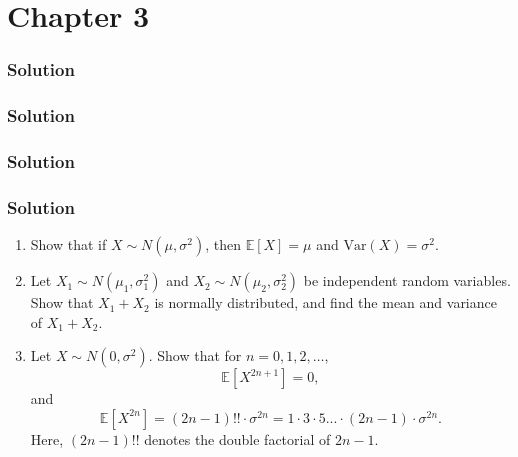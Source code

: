 \documentclass{article}
\begin{document}
\section{Chapter 3}

\exercise
\subsubsection*{Solution}

\exercise
\subsubsection*{Solution}
\exercise
\subsubsection*{Solution}
\exercise
\subsubsection*{Solution}
\exercise
\begin{enumerate}[label=(\alph*)]
    \item Show that if \( X \sim N(\mu, \sigma^2) \), then \( \mathbb{E}[X] = \mu \) and \( \text{Var}(X) = \sigma^2 \).
    \item Let \( X_1 \sim N(\mu_1, \sigma_1^2) \) and \( X_2 \sim N(\mu_2, \sigma_2^2) \) be independent random variables. Show that \( X_1 + X_2 \) is normally distributed, and find the mean and variance of \( X_1 + X_2 \).
    \item Let \( X \sim N(0,\sigma^2) \). Show that for \( n = 0, 1, 2, \ldots \),
    \[
    \mathbb{E}[X^{2n+1}] = 0, 
    \]
    and 
    \[
    \mathbb{E}[X^{2n}] = (2n-1)!! \cdot \sigma^{2n} = 1 \cdot 3 \cdot 5 ... \cdot (2n-1) \cdot \sigma^{2n}.
    \]
    Here, \( (2n-1)!! \) denotes the double factorial of \( 2n-1 \).
\end{enumerate}
\end{document}
